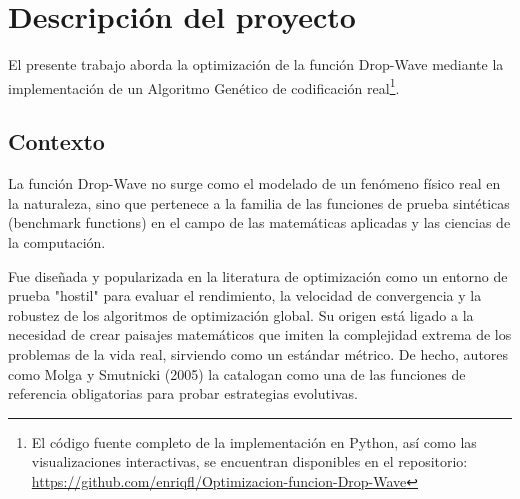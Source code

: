 %
%

\section{Descripción del proyecto}
El presente trabajo aborda la optimización de la función Drop-Wave mediante la implementación de un Algoritmo Genético de codificación real\footnote{El código fuente completo
de la implementación en Python, así como las visualizaciones interactivas, se encuentran disponibles en el repositorio:
\url{https://github.com/enriqfl/Optimizacion-funcion-Drop-Wave}}.

\subsection{Contexto}

La función Drop-Wave no surge como el modelado de un fenómeno físico real en la naturaleza, sino que pertenece a
la familia de las funciones de prueba sintéticas (benchmark functions) en el campo de las matemáticas aplicadas y las ciencias de la computación.

Fue diseñada y popularizada en la literatura de optimización como un entorno de prueba "hostil" para evaluar el rendimiento, la velocidad de
convergencia y la robustez de los algoritmos de optimización global. Su origen está ligado a la necesidad de crear paisajes matemáticos que imiten la
complejidad extrema de los problemas de la vida real, sirviendo como un estándar métrico. De hecho, autores como Molga y Smutnicki (2005)
la catalogan como una de las funciones de referencia obligatorias para probar estrategias evolutivas.

